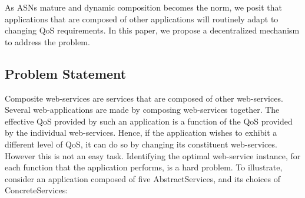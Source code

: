 \documentclass[10pt,journal,compsoc]{IEEEtran}
\begin{document}
As ASNs mature and dynamic composition becomes the norm, we posit that applications that are composed of other applications will routinely adapt to changing QoS requirements. In this paper, we propose a decentralized mechanism to address the problem.  
\subsection{Problem Statement}
Composite web-services are services that are composed of other web-services. Several web-applications are made by composing web-services together. The effective QoS provided by such an application is a function of the QoS provided by the individual web-services. Hence, if the application wishes to exhibit a different level of QoS, it can do so by changing its constituent web-services. However this is not an easy task. Identifying the optimal web-service instance, for each function that the application performs, is a hard problem. To illustrate, consider an application composed of five AbstractServices, and its choices of ConcreteServices:
\end{document}
